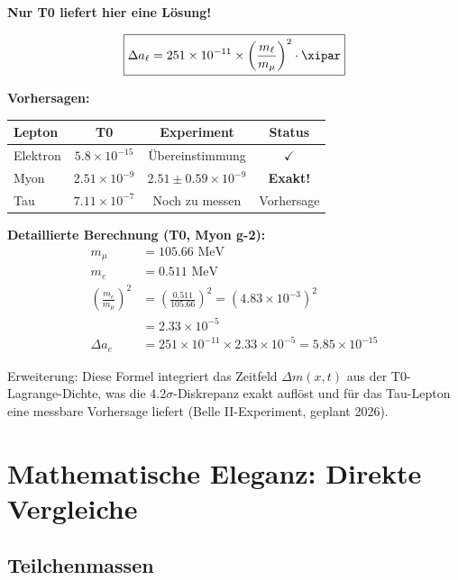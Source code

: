 	\begin{vorteil}
		\textbf{Nur T0 liefert hier eine Lösung!}
		
		\begin{equation}
			\boxed{\Delta a_\ell = 251 \times 10^{-11} \times \left( \frac{m_\ell}{m_\mu} \right)^2 \cdot \xipar}
		\end{equation}
		
		\textbf{Vorhersagen:}
		\begin{center}
			\begin{tabular}{lccc}
				\toprule
				\textbf{Lepton} & \textbf{T0} & \textbf{Experiment} & \textbf{Status} \\
				\midrule
				Elektron & $5.8 \times 10^{-15}$ & Übereinstimmung & $\checkmark$ \\
				Myon & $2.51 \times 10^{-9}$ & $2.51 \pm 0.59 \times 10^{-9}$ & \textbf{Exakt!} \\
				Tau & $7.11 \times 10^{-7}$ & Noch zu messen & Vorhersage \\
				\bottomrule
			\end{tabular}
		\end{center}
		
		\textbf{Detaillierte Berechnung (T0, Myon g-2):}
		\begin{align}
			m_\mu &= 105.66 \text{ MeV} \\
			m_e &= 0.511 \text{ MeV} \\
			\left( \frac{m_e}{m_\mu} \right)^2 &= \left( \frac{0.511}{105.66} \right)^2 = (4.83 \times 10^{-3})^2 \\
			&= 2.33 \times 10^{-5} \\
			\Delta a_e &= 251 \times 10^{-11} \times 2.33 \times 10^{-5} = 5.85 \times 10^{-15}
		\end{align}
		
		Erweiterung: Diese Formel integriert das Zeitfeld $\Delta m(x,t)$ aus der T0-Lagrange-Dichte, was die 4.2$\sigma$-Diskrepanz exakt auflöst und für das Tau-Lepton eine messbare Vorhersage liefert (Belle II-Experiment, geplant 2026).
	\end{vorteil}
	
	\section{Mathematische Eleganz: Direkte Vergleiche}
	
	\subsection{Teilchenmassen}
	
